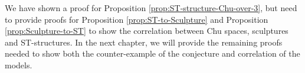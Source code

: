     We have shown a proof for Proposition \ref{prop:ST-structure-Chu-over-3}, but need to provide proofs for Proposition \ref{prop:ST-to-Sculpture} and Proposition \ref{prop:Sculpture-to-ST} to show the correlation between Chu spaces, sculptures and ST-structures. In the next chapter, we will provide the remaining proofs needed to show both the counter-example of the conjecture and correlation of the models.